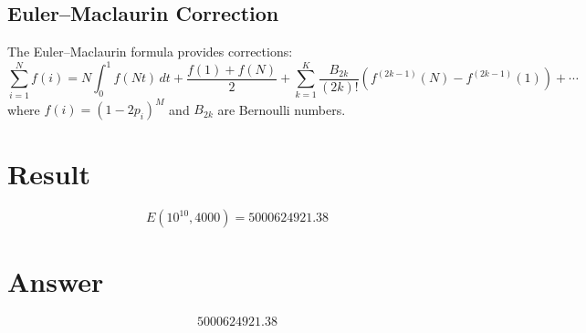 \documentclass[12pt]{article}
\begin{document}
\subsection{Euler--Maclaurin Correction}
The Euler--Maclaurin formula provides corrections:
\[
\sum_{i=1}^{N} f(i) = N\int_0^1 f(Nt)\,dt + \frac{f(1)+f(N)}{2} + \sum_{k=1}^{K} \frac{B_{2k}}{(2k)!} \left(f^{(2k-1)}(N) - f^{(2k-1)}(1)\right) + \cdots
\]
where $f(i) = (1-2p_i)^M$ and $B_{2k}$ are Bernoulli numbers.

\section{Result}
\[
\boxed{E(10^{10}, 4000) = 5000624921.38}
\]

\section{Answer}

\[
\boxed{5000624921.38}
\]
\end{document}
